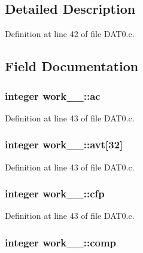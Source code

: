 \subsection{Detailed Description}


Definition at line 42 of file D\+A\+T0.\+c.



\subsection{Field Documentation}
\subsubsection[{\texorpdfstring{ac}{ac}}]{\setlength{\rightskip}{0pt plus 5cm}integer work\+\_\+\_\+\+::ac}\hypertarget{structwork__1___ae0e1043cc8776bd432dabc60671dcb24}{}\label{structwork__1___ae0e1043cc8776bd432dabc60671dcb24}


Definition at line 43 of file D\+A\+T0.\+c.

\subsubsection[{\texorpdfstring{avt}{avt}}]{\setlength{\rightskip}{0pt plus 5cm}integer work\+\_\+\_\+\+::avt\mbox{[}32\mbox{]}}\hypertarget{structwork__1___af663adb0702a1e1edb4ee62317c13ecf}{}\label{structwork__1___af663adb0702a1e1edb4ee62317c13ecf}


Definition at line 43 of file D\+A\+T0.\+c.

\subsubsection[{\texorpdfstring{cfp}{cfp}}]{\setlength{\rightskip}{0pt plus 5cm}integer work\+\_\+\_\+\+::cfp}\hypertarget{structwork__1___aee0112d5275cf9e11cf7db52f700fe66}{}\label{structwork__1___aee0112d5275cf9e11cf7db52f700fe66}


Definition at line 43 of file D\+A\+T0.\+c.

\subsubsection[{\texorpdfstring{comp}{comp}}]{\setlength{\rightskip}{0pt plus 5cm}integer work\+\_\+\_\+\+::comp}\hypertarget{structwork__1___a490e95c3cd0bdf121a02be31f54d6ce0}{}\label{structwork__1___a490e95c3cd0bdf121a02be31f54d6ce0}


